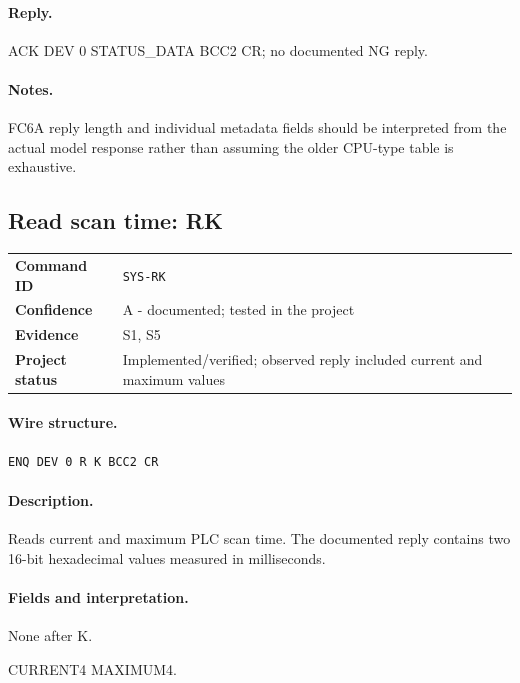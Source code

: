 \documentclass[10pt,letterpaper]{article}
\begin{document}
\paragraph{Reply.} ACK DEV 0 STATUS\_DATA BCC2 CR; no documented NG reply.
\paragraph{Notes.} FC6A reply length and individual metadata fields should be interpreted from the actual model response rather than assuming the older CPU-type table is exhaustive.

\subsection{Read scan time: RK}
\begin{tabularx}{\textwidth}{@{}>{\bfseries}p{2.8cm}X@{}}
Command ID & \texttt{SYS-RK} \\
Confidence & A - documented; tested in the project \\
Evidence & S1, S5 \\
Project status & Implemented/verified; observed reply included current and maximum values \\
\end{tabularx}
\vspace{0.35em}
\paragraph{Wire structure.}
\begin{Verbatim}[breaklines=true,breakanywhere=true,fontsize=\small]
ENQ DEV 0 R K BCC2 CR
\end{Verbatim}
\paragraph{Description.} Reads current and maximum PLC scan time. The documented reply contains two 16-bit hexadecimal values measured in milliseconds.
\paragraph{Fields and interpretation.}
\begin{description}[style=nextline,leftmargin=3.2cm,labelwidth=3.0cm,font=\normalfont\bfseries]
\item[Request payload] None after K.
\item[Reply data] CURRENT4 MAXIMUM4.
\end{description}
\end{document}
